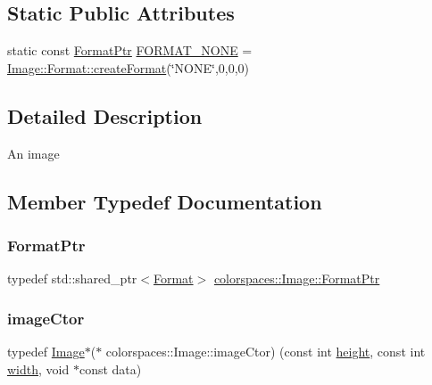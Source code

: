 \subsection*{Static Public Attributes}
\begin{DoxyCompactItemize}
\item 
static const \hyperlink{classcolorspaces_1_1_image_ab3978cc7acc2b5e855f8c715f09667d1}{Format\+Ptr} \hyperlink{classcolorspaces_1_1_image_a53b533100b5fd24fae3617f271c73271}{F\+O\+R\+M\+A\+T\+\_\+\+N\+O\+NE} = \hyperlink{classcolorspaces_1_1_image_1_1_format_ae79208f237b72cf596331ebcec2ff58b}{Image\+::\+Format\+::create\+Format}(\char`\"{}N\+O\+NE\char`\"{},0,0,0)
\end{DoxyCompactItemize}


\subsection{Detailed Description}
An image 

\subsection{Member Typedef Documentation}
\mbox{\label{classcolorspaces_1_1_image_ab3978cc7acc2b5e855f8c715f09667d1}} 
\subsubsection{\texorpdfstring{Format\+Ptr}{FormatPtr}}
{\footnotesize\ttfamily typedef std\+::shared\+\_\+ptr$<$\hyperlink{classcolorspaces_1_1_image_1_1_format}{Format}$>$ \hyperlink{classcolorspaces_1_1_image_ab3978cc7acc2b5e855f8c715f09667d1}{colorspaces\+::\+Image\+::\+Format\+Ptr}}

\mbox{\label{classcolorspaces_1_1_image_a5d086f8bb03d6eab9c3accfd0040e28d}} 
\subsubsection{\texorpdfstring{image\+Ctor}{imageCtor}}
{\footnotesize\ttfamily typedef \hyperlink{classcolorspaces_1_1_image}{Image}$\ast$($\ast$ colorspaces\+::\+Image\+::image\+Ctor) (const int \hyperlink{classcolorspaces_1_1_image_a99a05ebd37f61215b2c3042ecaefdbfc}{height}, const int \hyperlink{classcolorspaces_1_1_image_ab80af7d4797110c23ed575b329ec7c4f}{width}, void $\ast$const data)}

